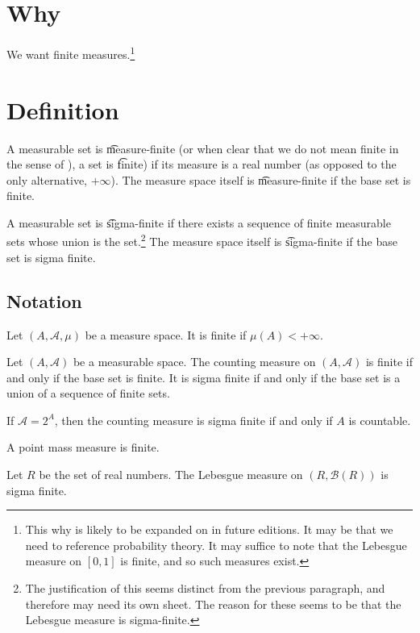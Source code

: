 
\section*{Why}

We want finite measures.\footnote{This why is likely to be expanded on in future editions. It may be that we need to reference probability theory. It may suffice to note that the Lebesgue measure on $[0, 1]$ is finite, and so such measures exist.}

\section*{Definition}

A measurable set is \t{measure-finite} (or when clear that we do not mean finite in the sense of ), a set is \t{finite}) if its measure is a real number (as opposed to the only alternative, $+\infty$).
The measure space itself is \t{measure-finite} if the base set is finite.

A measurable set is \t{sigma-finite} if there exists a sequence of finite measurable sets whose union is the set.\footnote{The justification of this seems distinct from the previous paragraph, and therefore may need its own sheet. The reason for these seems to be that the Lebesgue measure is sigma-finite.}
The measure space itself is \t{sigma-finite} if the base set is sigma finite.

\subsection*{Notation}

Let $(A, \mathcal{A} , \mu )$ be a measure space.
It is finite if $\mu (A) < +\infty$.

\begin{example}
Let $(A, \mathcal{A} )$ be a measurable space.
The counting measure on $(A, \mathcal{A} )$ is
finite if and only if the base set is finite.
It is sigma finite if and only if the base
set is a union of a sequence of finite sets.

If $\mathcal{A}  = 2^A$, then the counting
measure is sigma finite if and only if
$A$ is countable.

\end{example}

\begin{example}
A point mass measure is finite.
\end{example}

\begin{example}
Let $R$ be the set of real numbers.
The Lebesgue measure on
$(R, \mathcal{B} (R))$ is sigma finite.
\end{example}

\blankpage
